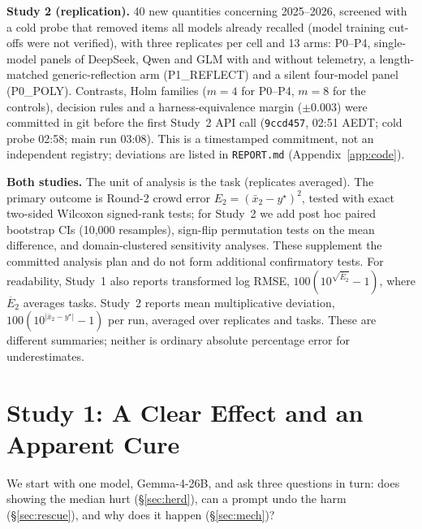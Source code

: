 \documentclass[10pt]{article}
\theoremstyle{manuscript}\newtheorem{proposition}{Proposition}
\begin{document}
\textbf{Study 2 (replication).} 40 new quantities concerning 2025--2026, screened with a cold probe that removed items all models already recalled (model training cut-offs were not verified), with three replicates per cell and 13 arms: P0--P4, single-model panels of DeepSeek, Qwen and GLM with and without telemetry, a length-matched generic-reflection arm (P1\_REFLECT) and a silent four-model panel (P0\_POLY). Contrasts, Holm families ($m=4$ for P0--P4, $m=8$ for the controls), decision rules and a harness-equivalence margin ($\pm0.003$) were committed in git before the first Study~2 API call (\texttt{9ccd457}, 02:51 AEDT; cold probe 02:58; main run 03:08). This is a timestamped commitment, not an independent registry; deviations are listed in \texttt{REPORT.md} (Appendix~\ref{app:code}).

\textbf{Both studies.} The unit of analysis is the task (replicates averaged). The primary outcome is Round-2 crowd error $E_2=(\bar x_2-y^\star)^2$, tested with exact two-sided Wilcoxon signed-rank tests; for Study~2 we add post hoc paired bootstrap CIs (10,000 resamples), sign-flip permutation tests on the mean difference, and domain-clustered sensitivity analyses. These supplement the committed analysis plan and do not form additional confirmatory tests. For readability, Study~1 also reports transformed log RMSE, $100(10^{\sqrt{\overline E_2}}-1)$, where $\overline E_2$ averages tasks. Study~2 reports mean multiplicative deviation, $100(10^{|\bar x_2-y^\star|}-1)$ per run, averaged over replicates and tasks. These are different summaries; neither is ordinary absolute percentage error for underestimates.

\section{Study 1: A Clear Effect and an Apparent Cure}\label{sec:results}
We start with one model, Gemma-4-26B, and ask three questions in turn: does showing the median hurt (\S\ref{sec:herd}), can a prompt undo the harm (\S\ref{sec:rescue}), and why does it happen (\S\ref{sec:mech})?
\end{document}
